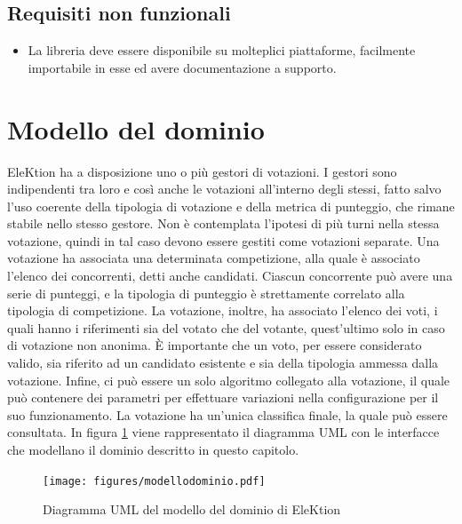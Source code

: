 \documentclass[12pt,a4paper,openright,twoside]{book}
\begin{document}
    \subsection{Requisiti non funzionali}
    \begin{itemize}
    \item{La libreria deve essere disponibile su molteplici piattaforme, facilmente importabile in esse ed avere documentazione
    a supporto.}
    \end{itemize}


\section{Modello del dominio}
\label{modellodominio}
EleKtion ha a disposizione uno o più gestori di votazioni. 
I gestori sono indipendenti tra loro e così anche le votazioni all'interno degli stessi,
fatto salvo l'uso coerente della tipologia di votazione e della metrica di punteggio,
che rimane stabile nello stesso gestore.
Non è contemplata l'ipotesi di più turni nella stessa votazione, 
quindi in tal caso devono essere gestiti come votazioni separate.
Una votazione ha associata una determinata competizione, 
alla quale è associato l'elenco dei concorrenti, detti anche candidati. 
Ciascun concorrente può avere una serie di punteggi,
e la tipologia di punteggio è strettamente correlato alla tipologia di competizione.
La votazione, inoltre, ha associato l'elenco dei voti,
i quali hanno i riferimenti sia del votato che del votante,
quest'ultimo solo in caso di votazione non anonima.
È importante che un voto, per essere considerato valido, 
sia riferito ad un candidato esistente e sia della tipologia ammessa dalla votazione.
Infine, ci può essere un solo algoritmo collegato alla votazione,
il quale può contenere dei parametri per effettuare variazioni nella configurazione per il suo funzionamento.
La votazione ha un'unica classifica finale, la quale può essere consultata.
In figura \ref{fig:modellodominio} viene rappresentato il diagramma UML con le interfacce che modellano
il dominio descritto in questo capitolo.
\newpage
\begin{figure}

    
    \texttt{[image: figures/modellodominio.pdf]}
    \caption{Diagramma UML del modello del dominio di EleKtion}
   \label{fig:modellodominio}
\end{figure}

\end{document}
